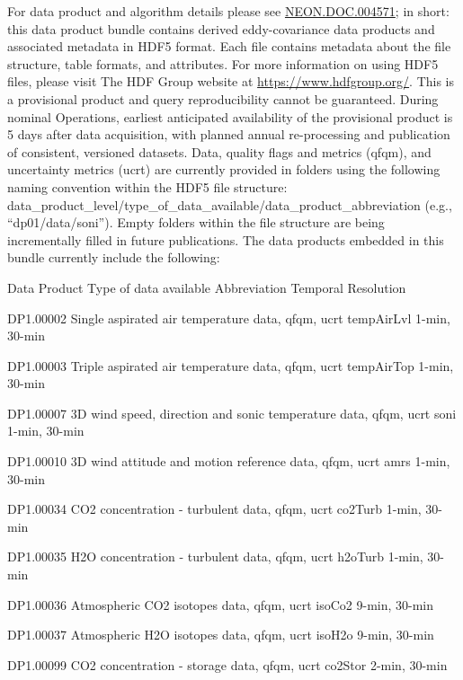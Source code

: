 \documentclass[]{article}
\begin{document}
For data product and algorithm details please see
\href{http://data.neonscience.org/documents}{NEON.DOC.004571}; in short:
this data product bundle contains derived eddy-covariance data products
and associated metadata in HDF5 format. Each file contains metadata
about the file structure, table formats, and attributes. For more
information on using HDF5 files, please visit The HDF Group website at
\url{https://www.hdfgroup.org/}. This is a provisional product and query
reproducibility cannot be guaranteed. During nominal Operations,
earliest anticipated availability of the provisional product is 5 days
after data acquisition, with planned annual re-processing and
publication of consistent, versioned datasets. Data, quality flags and
metrics (qfqm), and uncertainty metrics (ucrt) are currently provided in
folders using the following naming convention within the HDF5 file
structure:
data\_product\_level/type\_of\_data\_available/data\_product\_abbreviation
(e.g., ``dp01/data/soni''). Empty folders within the file structure are
being incrementally filled in future publications. The data products
embedded in this bundle currently include the following:

Data Product \textbar{} Type of data available \textbar{} Abbreviation
\textbar{} Temporal Resolution

DP1.00002 Single aspirated air temperature \textbar{} data, qfqm, ucrt
\textbar{} tempAirLvl \textbar{} 1-min, 30-min

DP1.00003 Triple aspirated air temperature \textbar{} data, qfqm, ucrt
\textbar{} tempAirTop \textbar{} 1-min, 30-min

DP1.00007 3D wind speed, direction and sonic temperature \textbar{}
data, qfqm, ucrt \textbar{} soni \textbar{} 1-min, 30-min

DP1.00010 3D wind attitude and motion reference \textbar{} data, qfqm,
ucrt \textbar{} amrs \textbar{} 1-min, 30-min

DP1.00034 CO2 concentration - turbulent \textbar{} data, qfqm, ucrt
\textbar{} co2Turb \textbar{} 1-min, 30-min

DP1.00035 H2O concentration - turbulent \textbar{} data, qfqm, ucrt
\textbar{} h2oTurb \textbar{} 1-min, 30-min

DP1.00036 Atmospheric CO2 isotopes \textbar{} data, qfqm, ucrt
\textbar{} isoCo2 \textbar{} 9-min, 30-min

DP1.00037 Atmospheric H2O isotopes \textbar{} data, qfqm, ucrt
\textbar{} isoH2o \textbar{} 9-min, 30-min

DP1.00099 CO2 concentration - storage \textbar{} data, qfqm, ucrt
\textbar{} co2Stor \textbar{} 2-min, 30-min
\end{document}
